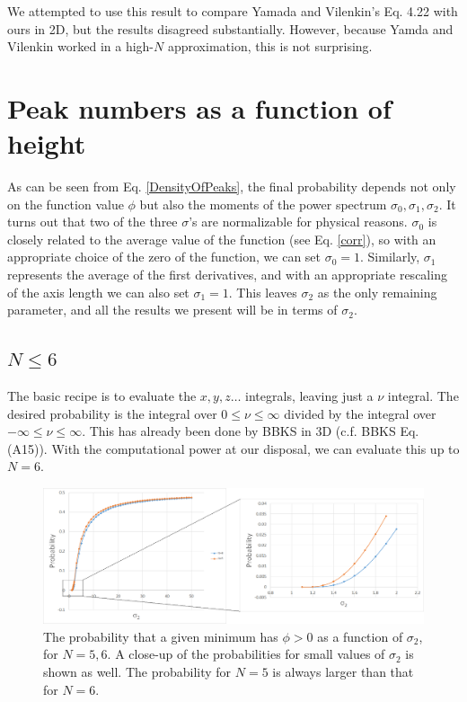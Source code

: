 \documentclass[12pt]{article}
\begin{document}
We attempted to use this result to compare Yamada and Vilenkin's Eq. 4.22 with ours in 2D, but the results disagreed substantially. However, because Yamda and Vilenkin worked in a high-$N$ approximation, this is not surprising.

\section{Peak numbers as a function of height} \label{PeakNumbers}

As can be seen from Eq. \ref{DensityOfPeaks}, the final probability depends not only on the function value $\phi$ but also the moments of the power spectrum $\sigma_0, \sigma_1, \sigma_2$. It turns out that two of the three $\sigma$'s are normalizable for physical reasons. $\sigma_0$ is closely related to the average value of the function (see Eq. \ref{corr}), so with an appropriate choice of the zero of the function, we can set $\sigma_0 = 1$. Similarly, $\sigma_1$ represents the average of the first derivatives, and with an appropriate rescaling of the axis length we can also set $\sigma_1 = 1$. This leaves $\sigma_2$ as the only remaining parameter, and all the results we present will be in terms of $\sigma_2$.

\subsection{$N \leq 6$}
The basic recipe is to evaluate the $x, y, z \ldots$ integrals, leaving just a $\nu$ integral. The desired probability is the integral over $0 \leq \nu \leq \infty$ divided by the integral over $-\infty \leq \nu \leq \infty$. This has already been done by BBKS in 3D (c.f. BBKS Eq. (A15)). With the computational power at our disposal, we can evaluate this up to $N=6$.

\begin{figure}
  \centering
  \includegraphics[width=\linewidth]{N6minima.png}
  \caption{The probability that a given minimum has $\phi > 0$ as a function of $\sigma_2$, for $N=5,6$. A close-up of the probabilities for small values of $\sigma_2$ is shown as well. The probability for $N=5$ is always larger than that for $N=6$.}
  \label{N6}
\end{figure}
\end{document}

